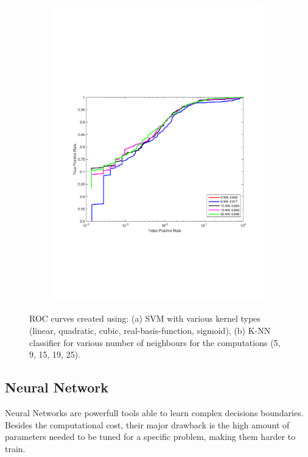 \begin{figure}[h]
  \begin{subfigure}[b]{0.49\textwidth}
    \includegraphics[width=\textwidth]{figures/K_NN.pdf}
    \caption{}
    \label{fig:K_NN}
  \end{subfigure}
  \caption{ROC curves created using: (a) SVM with various kernel types (linear, quadratic, cubic, real-basis-function, sigmoid), (b) K-NN classifier for various number of neighbours for the computations (5, 9, 15, 19, 25).}
\end{figure}

\subsection{Neural Network}
Neural Networks are powerfull tools able to learn complex decisions boundaries. Besides the computational cost, their major drawback is the high amount of parameters needed to be tuned for a specific problem, making them harder to train.

